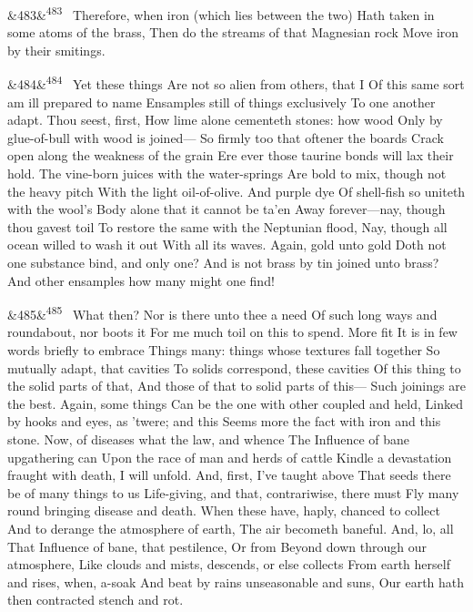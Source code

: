 \documentclass[12pt]{article}
\newcommand{\para}[1][]{\par\noindent\ifx&#1&\else\textsuperscript{\footnotesize #1}~\fi}
\begin{document}
\para[483] Therefore, when iron (which lies between the two) Hath taken in some atoms of the brass, Then do the streams of that Magnesian rock Move iron by their smitings.

\para[484] Yet these things Are not so alien from others, that I Of this same sort am ill prepared to name Ensamples still of things exclusively To one another adapt. Thou seest, first, How lime alone cementeth stones: how wood Only by glue-of-bull with wood is joined--- So firmly too that oftener the boards Crack open along the weakness of the grain Ere ever those taurine bonds will lax their hold. The vine-born juices with the water-springs Are bold to mix, though not the heavy pitch With the light oil-of-olive. And purple dye Of shell-fish so uniteth with the wool's Body alone that it cannot be ta'en Away forever---nay, though thou gavest toil To restore the same with the Neptunian flood, Nay, though all ocean willed to wash it out With all its waves. Again, gold unto gold Doth not one substance bind, and only one? And is not brass by tin joined unto brass? And other ensamples how many might one find!

\para[485] What then? Nor is there unto thee a need Of such long ways and roundabout, nor boots it For me much toil on this to spend. More fit It is in few words briefly to embrace Things many: things whose textures fall together So mutually adapt, that cavities To solids correspond, these cavities Of this thing to the solid parts of that, And those of that to solid parts of this--- Such joinings are the best. Again, some things Can be the one with other coupled and held, Linked by hooks and eyes, as 'twere; and this Seems more the fact with iron and this stone. Now, of diseases what the law, and whence The Influence of bane upgathering can Upon the race of man and herds of cattle Kindle a devastation fraught with death, I will unfold. And, first, I've taught above That seeds there be of many things to us Life-giving, and that, contrariwise, there must Fly many round bringing disease and death. When these have, haply, chanced to collect And to derange the atmosphere of earth, The air becometh baneful. And, lo, all That Influence of bane, that pestilence, Or from Beyond down through our atmosphere, Like clouds and mists, descends, or else collects From earth herself and rises, when, a-soak And beat by rains unseasonable and suns, Our earth hath then contracted stench and rot.
\end{document}
